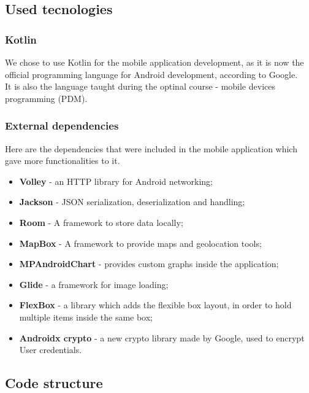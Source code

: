 \subsection{Used tecnologies}

\subsubsection{Kotlin}

We chose to use Kotlin for the mobile application development, as it is now the official programming language for Android development,
according to Google.\\

It is also the language taught during the optinal course - mobile devices programming (PDM).\\

\subsubsection{External dependencies}

Here are the dependencies that were included in the mobile application which gave more functionalities to it.

\begin{itemize}
    \item \textbf{Volley} - an HTTP library for Android networking;
    \item \textbf{Jackson} - JSON serialization, deserialization and handling;
    \item \textbf{Room} - A framework to store data locally;
    \item \textbf{MapBox} - A framework to provide maps and geolocation tools;
    \item \textbf{MPAndroidChart} - provides custom graphs inside the application;
    \item \textbf{Glide} - a framework for image loading;
    \item \textbf{FlexBox} - a library which adds the flexible box layout, in order to hold multiple items
    inside the same box;
    \item \textbf{Androidx crypto} - a new crypto library made by Google, used to encrypt User credentials.
\end{itemize}

\subsection{Code structure}

